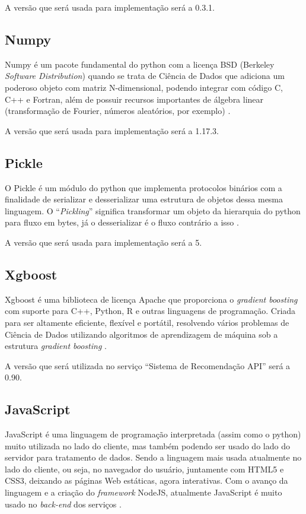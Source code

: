 A versão que será usada para implementação será a 0.3.1.

\subsection{Numpy}

Numpy é um pacote fundamental do python com a licença BSD (Berkeley \textit{Software Distribution}) quando se trata de Ciência de Dados que adiciona um poderoso objeto com matriz N-dimensional, podendo integrar com código C, C++ e Fortran, além de possuir recursos importantes de álgebra linear (transformação de Fourier, números aleatórios, por exemplo) \cite{numpy:2019}.

A versão que será usada para implementação será a 1.17.3.

\subsection{Pickle}

O Pickle é um módulo do python que implementa protocolos binários com a finalidade de serializar e desserializar uma estrutura de objetos dessa mesma linguagem. O “\textit{Pickling}” significa transformar um objeto da hierarquia do python para fluxo em bytes, já o desserializar é o fluxo contrário a isso \cite{pickle:2019}.

A versão que será usada para implementação será a 5.

\subsection{Xgboost}

Xgboost é uma biblioteca de licença Apache que proporciona o \textit{gradient boosting} com suporte para C++, Python, R e outras linguagens de programação. Criada para ser altamente eficiente, flexível e portátil, resolvendo vários problemas de Ciência de Dados utilizando algoritmos de aprendizagem de máquina sob a estrutura \textit{gradient boosting} \cite{XGBOOST:2019}.

A versão que será utilizada no serviço “Sistema de Recomendação API” será a 0.90.

\subsection{JavaScript}

JavaScript é uma linguagem de programação interpretada (assim como o python) muito utilizada no lado do cliente, mas também podendo ser usado do lado do servidor para tratamento de dados. Sendo a linguagem mais usada atualmente no lado do cliente, ou seja, no navegador do usuário, juntamente com HTML5 e CSS3, deixando as páginas Web estáticas, agora interativas. Com o avanço da linguagem e a criação do \textit{framework} NodeJS, atualmente JavaScript é muito usado no \textit{back-end} dos serviços \cite{JavaScript:2019}.

